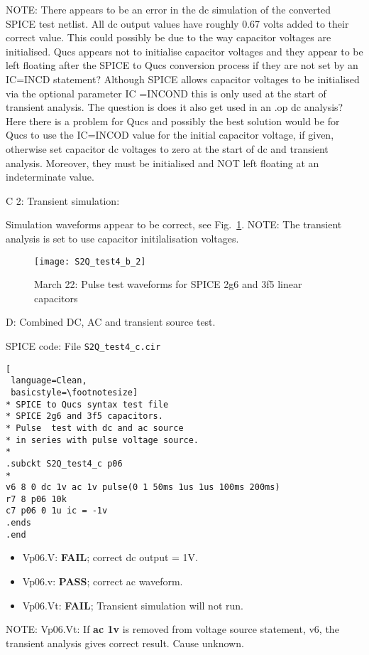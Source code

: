 NOTE: There appears to be an error in the dc simulation of the converted SPICE test netlist.  All dc output values have roughly 0.67 volts added to their correct value.  This could possibly be due to the way capacitor voltages are initialised. Qucs appears not to initialise capacitor voltages and they appear to be left floating after the SPICE to Qucs conversion process if they are not set by an IC=INCD statement?  Although SPICE allows capacitor voltages to be initialised via the optional parameter IC =INCOND this is only used at the start of transient analysis. The question is does it also get used in an .op dc analysis?  Here there is a problem for Qucs and possibly the best solution would be for Qucs to use the IC=INCOD value for the initial capacitor voltage, if given, otherwise set capacitor dc voltages to zero at the start of dc and transient analysis. Moreover, they must be initialised and NOT left floating at an indeterminate value.

\begin{flushleft}

C 2: Transient simulation:


Simulation waveforms appear to be correct, see Fig.~\ref{fig:S2Qtest4_5}.
NOTE: The transient analysis is set to use capacitor initilalisation voltages.


\begin{figure}
  \centering
  \texttt{[image: S2Q\_test4\_b\_2]}
  \caption{March 22: Pulse test waveforms for SPICE 2g6 and 3f5 linear capacitors}
  \label{fig:S2Qtest4_5}
\end{figure} 
\end{flushleft}
\newpage 
\begin{flushleft}
 D: Combined DC, AC and transient source test.

SPICE code: File \verb|S2Q_test4_c.cir|

\begin{lstlisting}[
 language=Clean, 
 basicstyle=\footnotesize]
* SPICE to Qucs syntax test file 
* SPICE 2g6 and 3f5 capacitors.
* Pulse  test with dc and ac source
* in series with pulse voltage source.
*
.subckt S2Q_test4_c p06
*
v6 8 0 dc 1v ac 1v pulse(0 1 50ms 1us 1us 100ms 200ms)
r7 8 p06 10k
c7 p06 0 1u ic = -1v 
.ends
.end
\end{lstlisting} 

\end{flushleft}

\begin{flushleft}
 \begin{itemize}
 \item Vp06.V: \textbf{FAIL}; correct dc output = 1V.
 \item Vp06.v: \textbf{PASS}; correct ac waveform.
 \item Vp06.Vt: \textbf{FAIL}; Transient simulation will not run.
 
 \end{itemize}


\vspace{8mm}
NOTE: Vp06.Vt: If \textbf{ac 1v} is removed from voltage source statement, v6, the transient analysis gives correct result. Cause unknown.
\end{flushleft}


